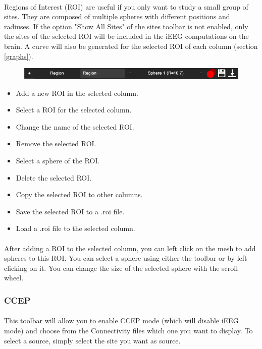 \documentclass[a4paper]{article}
\begin{document}
\paragraph{} Regions of Interest (ROI) are useful if you only want to study a small group of sites. They are composed of multiple spheres with different positions and radiuses. If the option "Show All Sites" of the sites toolbar is not enabled, only the sites of the selected ROI will be included in the iEEG computations on the brain. A curve will also be generated for the selected ROI of each column (section \ref{graphs}).
\begin{figure}[H]
\begin{center}
\includegraphics[scale=0.45]{ROI.png}
\end{center}
\end{figure}
\begin{itemize}
\item Add a new ROI in the selected column.
\item Select a ROI for the selected column.
\item Change the name of the selected ROI.
\item Remove the selected ROI.
\item Select a sphere of the ROI.
\item Delete the selected ROI.
\item Copy the selected ROI to other columns.
\item Save the selected ROI to a .roi file.
\item Load a .roi file to the selected column.
\end{itemize}
\paragraph{} After adding a ROI to the selected column, you can left click on the mesh to add spheres to this ROI. You can select a sphere using either the toolbar or by left clicking on it. You can change the size of the selected sphere with the scroll wheel.
\subsubsection{CCEP}
\paragraph{} This toolbar will allow you to enable CCEP mode (which will disable iEEG mode) and choose from the Connectivity files which one you want to display. To select a source, simply select the site you want as source.
\end{document}
